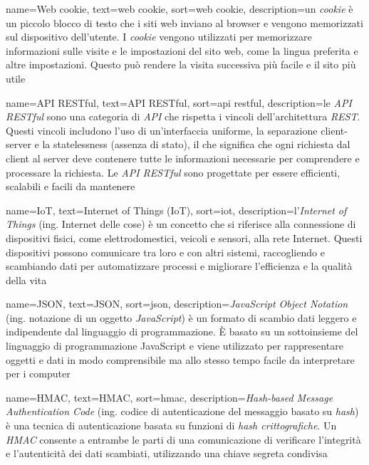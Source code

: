  {
    name=Web cookie,
    text=web cookie,
    sort=web cookie,
    description={un \emph{cookie} è un piccolo blocco di testo che i siti web inviano al browser e vengono memorizzati sul dispositivo dell'utente. I \emph{cookie} vengono utilizzati per memorizzare informazioni sulle visite e le impostazioni del sito web, come la lingua preferita e altre impostazioni. Questo può rendere la visita successiva più facile e il sito più utile}
}

 {
    name=API RESTful,
    text=API RESTful,
    sort=api restful,
    description={le \emph{API RESTful} sono una categoria di \emph{API} che rispetta i vincoli dell'architettura \emph{REST}. Questi vincoli includono l'uso di un'interfaccia uniforme, la separazione client-server e la statelessness (assenza di stato), il che significa che ogni richiesta dal client al server deve contenere tutte le informazioni necessarie per comprendere e processare la richiesta. Le \emph{API RESTful} sono progettate per essere efficienti, scalabili e facili da mantenere}
}

 {
    name=IoT,
    text=Internet of Things (IoT),
    sort=iot,
    description={l'\emph{Internet of Things} (ing. Internet delle cose) è un concetto che si riferisce alla connessione di dispositivi fisici, come elettrodomestici, veicoli e sensori, alla rete Internet. Questi dispositivi possono comunicare tra loro e con altri sistemi, raccogliendo e scambiando dati per automatizzare processi e migliorare l'efficienza e la qualità della vita}
}

 {
    name=JSON,
    text=JSON,
    sort=json,
    description={\emph{JavaScript Object Notation} (ing. notazione di un oggetto \emph{JavaScript}) è un formato di scambio dati leggero e indipendente dal linguaggio di programmazione. È basato su un sottoinsieme del linguaggio di programmazione JavaScript e viene utilizzato per rappresentare oggetti e dati in modo comprensibile ma allo stesso tempo facile da interpretare per i computer}
}

 {
    name=HMAC,
    text=HMAC,
    sort=hmac,
    description={\emph{Hash-based Message Authentication Code} (ing. codice di autenticazione del messaggio basato su \emph{hash}) è una tecnica di autenticazione basata su funzioni di \emph{hash crittografiche}. Un \emph{HMAC} consente a entrambe le parti di una comunicazione di verificare l'integrità e l'autenticità dei dati scambiati, utilizzando una chiave segreta condivisa}
}

